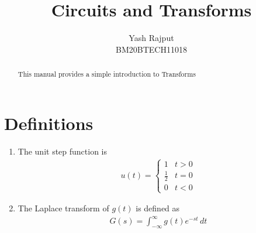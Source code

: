 \documentclass[journal,12pt,twocolumn]{IEEEtran}
\renewcommand\thesection{\arabic{section}}
\begin{document}
\let\StandardTheFigure\thefigure
\renewcommand{\thefigure}{\theproblem}
\renewcommand{\thefigure}{\arabic{section}.\arabic{figure}}
\makeatletter
{}
\makeatother


\def\putbox#1#2#3{\makebox[0in][l]{\makebox[#1][l]{}\raisebox{\baselineskip}[0in][0in]{\raisebox{#2}[0in][0in]{#3}}}}
     \def\rightbox#1{\makebox[0in][r]{#1}}
     \def\centbox#1{\makebox[0in]{#1}}
     \def\topbox#1{\raisebox{-\baselineskip}[0in][0in]{#1}}
     \def\midbox#1{\raisebox{-0.5\baselineskip}[0in][0in]{#1}}

\vspace{3cm}

\title{ 
Circuits and Transforms
}

\author{Yash Rajput\\BM20BTECH11018}

\maketitle


\tableofcontents


\renewcommand{\thefigure}{\theenumi}
\renewcommand{\thetable}{\theenumi}



\bigskip

\begin{abstract}
This manual provides a simple introduction to Transforms
\end{abstract}

\section{Definitions}
\begin{enumerate}[label=\arabic*.,ref=\thesection.\theenumi]
\item The unit step function is 
\begin{align}
u(t) =
\begin{cases}
1 & t > 0
\\
	\frac{1}{2} & t = 0
\\
0 & t < 0
\end{cases}
\end{align}
\item The Laplace transform of $g(t)$ is defined as 
\begin{align}
	G(s) = \int_{-\infty}^{\infty} g(t) e^{-st}\, dt
\end{align}
 \end{enumerate}
\end{document}
